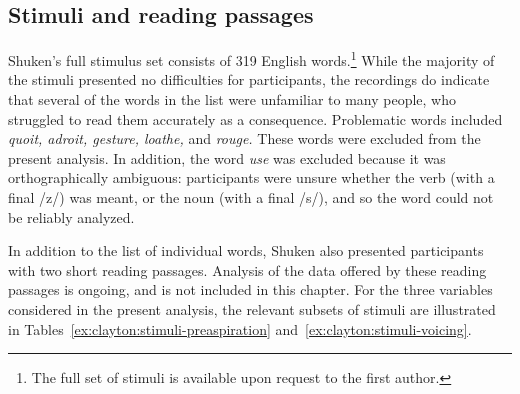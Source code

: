\documentclass[output=paper,colorlinks,citecolor=brown]{langscibook}
\begin{document}
\subsection{Stimuli and reading passages}

Shuken’s full stimulus set consists of 319 English words.\footnote{The full set of stimuli is available upon request to the first author.} While the majority of the stimuli presented no difficulties for participants, the recordings do indicate that several of the words in the list were unfamiliar to many people, who struggled to read them accurately as a consequence. Problematic words included \textit{quoit, adroit, gesture, loathe,} and \textit{rouge.} These words were excluded from the present analysis. In addition, the word \textit{use} was excluded because it was orthographically ambiguous: participants were unsure whether the verb (with a final /z/) was meant, or the noun (with a final /s/), and so the word could not be reliably analyzed. 

In addition to the list of individual words, Shuken also presented participants with two short reading passages. Analysis of the data offered by these reading passages is ongoing, and is not included in this chapter. For the three variables considered in the present analysis, the relevant subsets of stimuli are illustrated in Tables~\ref{ex:clayton:stimuli-preaspiration} and~\ref{ex:clayton:stimuli-voicing}.
\end{document}
